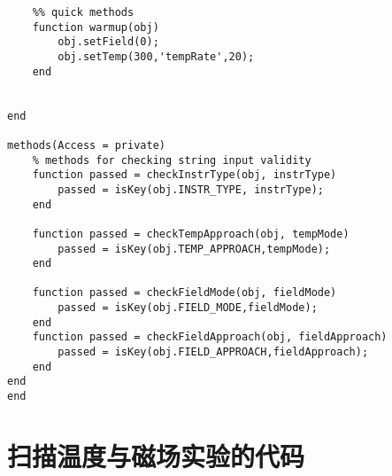 \begin{lstlisting}
    %% quick methods
    function warmup(obj)
        obj.setField(0);
        obj.setTemp(300,'tempRate',20);
    end
    
    
end

methods(Access = private)
    % methods for checking string input validity
    function passed = checkInstrType(obj, instrType)
        passed = isKey(obj.INSTR_TYPE, instrType);
    end

    function passed = checkTempApproach(obj, tempMode)
        passed = isKey(obj.TEMP_APPROACH,tempMode);
    end
    
    function passed = checkFieldMode(obj, fieldMode)
        passed = isKey(obj.FIELD_MODE,fieldMode);
    end
    function passed = checkFieldApproach(obj, fieldApproach)
        passed = isKey(obj.FIELD_APPROACH,fieldApproach);
    end
end
end
  \end{lstlisting}
    

  \section{扫描温度与磁场实验的代码} %
  \label{sec:扫描温度与磁场实验的代码}

